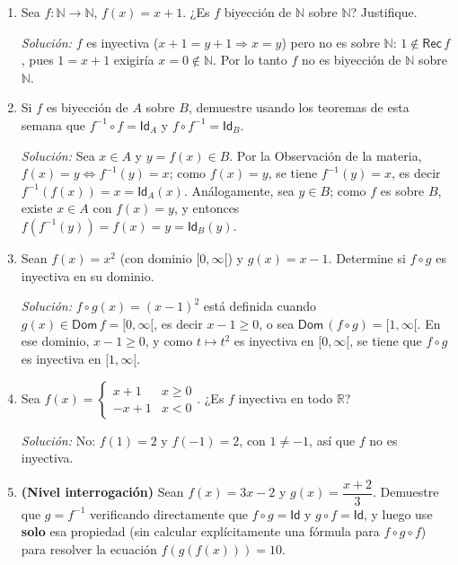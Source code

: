 \documentclass[11pt]{article}
\begin{document}
\begin{enumerate}[label=\arabic*.]
\textit{Solución:} Inyectiva: $5x-2=5y-2\Rightarrow x=y$. Sobre: dado $y\in\mathbb{R}$, sea
$x=\dfrac{y+2}{5}$; entonces $f(x)=5\left(\dfrac{y+2}{5}\right)-2=y+2-2=y$. Luego $f$ es biyección
de $\mathbb{R}$ sobre $\mathbb{R}$ y $f^{-1}(y)=\dfrac{y+2}{5}$.

\item Sea $f:\mathbb{N}\to\mathbb{N}$, $f(x) = x+1$. ¿Es $f$ biyección de $\mathbb{N}$ sobre
$\mathbb{N}$? Justifique.

\textit{Solución:} $f$ es inyectiva ($x+1=y+1\Rightarrow x=y$) pero no es sobre $\mathbb{N}$:
$1\notin\mathsf{Rec}\,f$, pues $1=x+1$ exigiría $x=0\notin\mathbb{N}$. Por lo tanto $f$ no es
biyección de $\mathbb{N}$ sobre $\mathbb{N}$.

\item Si $f$ es biyección de $A$ sobre $B$, demuestre usando los teoremas de esta semana que
$f^{-1}\circ f = \mathsf{Id}_A$ y $f \circ f^{-1} = \mathsf{Id}_B$.

\textit{Solución:} Sea $x\in A$ y $y=f(x)\in B$. Por la Observación de la materia,
$f(x)=y \iff f^{-1}(y)=x$; como $f(x)=y$, se tiene $f^{-1}(y)=x$, es decir
$f^{-1}(f(x))=x=\mathsf{Id}_A(x)$. Análogamente, sea $y\in B$; como $f$ es sobre $B$, existe
$x\in A$ con $f(x)=y$, y entonces $f(f^{-1}(y))=f(x)=y=\mathsf{Id}_B(y)$.

\item Sean $f(x) = x^2$ (con dominio $[0,\infty[$) y $g(x) = x - 1$. Determine si
$f\circ g$ es inyectiva en su dominio.

\textit{Solución:} $f\circ g(x)=(x-1)^2$ está definida cuando $g(x)\in\mathsf{Dom}\,f=[0,\infty[$,
es decir $x-1\ge0$, o sea $\mathsf{Dom}\,(f\circ g)=[1,\infty[$. En ese dominio, $x-1\ge0$, y como
$t\mapsto t^2$ es inyectiva en $[0,\infty[$, se tiene que $f\circ g$ es inyectiva en
$[1,\infty[$.

\item Sea $f(x)=\begin{cases} x+1 & x \ge 0\\ -x+1 & x<0\end{cases}$. ¿Es $f$ inyectiva en todo
$\mathbb{R}$?

\textit{Solución:} No: $f(1)=2$ y $f(-1)=2$, con $1\neq-1$, así que $f$ no es inyectiva.

\item \textbf{(Nivel interrogación)} Sean $f(x) = 3x-2$ y $g(x) = \dfrac{x+2}{3}$. Demuestre que
$g = f^{-1}$ verificando directamente que $f\circ g = \mathsf{Id}$ y $g\circ f = \mathsf{Id}$, y
luego use \textbf{solo} esa propiedad (sin calcular explícitamente una fórmula para
$f\circ g\circ f$) para resolver la ecuación $f(g(f(x))) = 10$.


\end{enumerate}
\end{document}
